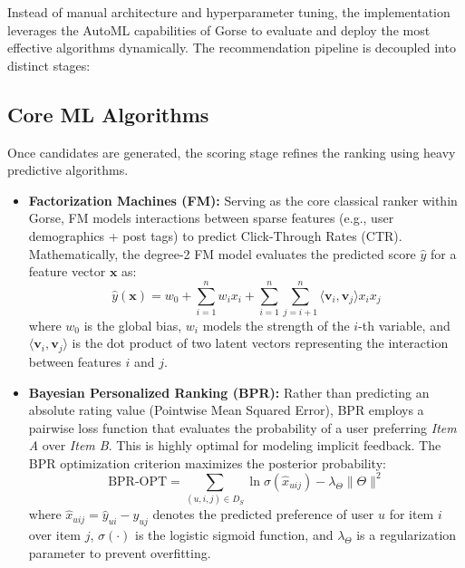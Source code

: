 Instead of manual architecture and hyperparameter tuning, the implementation leverages the AutoML capabilities of Gorse to evaluate and deploy the most effective algorithms dynamically. The recommendation pipeline is decoupled into distinct stages:

\subsection{Core ML Algorithms}
Once candidates are generated, the scoring stage refines the ranking using heavy predictive algorithms.
\begin{itemize}
    \item \textbf{Factorization Machines (FM):} Serving as the core classical ranker within Gorse, FM models interactions between sparse features (e.g., user demographics + post tags) to predict Click-Through Rates (CTR). Mathematically, the degree-2 FM model evaluates the predicted score $\hat{y}$ for a feature vector $\mathbf{x}$ as:
    \begin{equation}
    \hat{y}(\mathbf{x}) = w_0 + \sum_{i=1}^{n} w_i x_i + \sum_{i=1}^{n} \sum_{j=i+1}^{n} \langle \mathbf{v}_i, \mathbf{v}_j \rangle x_i x_j
    \end{equation}
    where $w_0$ is the global bias, $w_i$ models the strength of the $i$-th variable, and $\langle \mathbf{v}_i, \mathbf{v}_j \rangle$ is the dot product of two latent vectors representing the interaction between features $i$ and $j$.
    
    \item \textbf{Bayesian Personalized Ranking (BPR):} Rather than predicting an absolute rating value (Pointwise Mean Squared Error), BPR employs a pairwise loss function that evaluates the probability of a user preferring \textit{Item A} over \textit{Item B}. This is highly optimal for modeling implicit feedback. The BPR optimization criterion maximizes the posterior probability:
    \begin{equation}
    \text{BPR-OPT} = \sum_{(u,i,j) \in D_S} \ln \sigma(\hat{x}_{uij}) - \lambda_\Theta \|\Theta\|^2
    \end{equation}
    where $\hat{x}_{uij} = \hat{y}_{ui} - \hat{y}_{uj}$ denotes the predicted preference of user $u$ for item $i$ over item $j$, $\sigma(\cdot)$ is the logistic sigmoid function, and $\lambda_\Theta$ is a regularization parameter to prevent overfitting.
\end{itemize}

